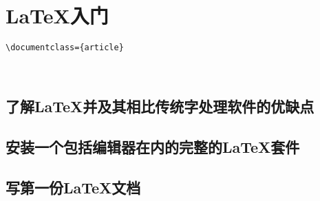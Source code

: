 \chapter{LaTeX入门}
\begin{lstlisting}[language={[LaTeX]TeX}]
	\documentclass={article}
	
	
\end{lstlisting}
	\section{了解LaTeX并及其相比传统字处理软件的优缺点}
	\section{安装一个包括编辑器在内的完整的LaTeX套件}
	\section{写第一份LaTeX文档}
